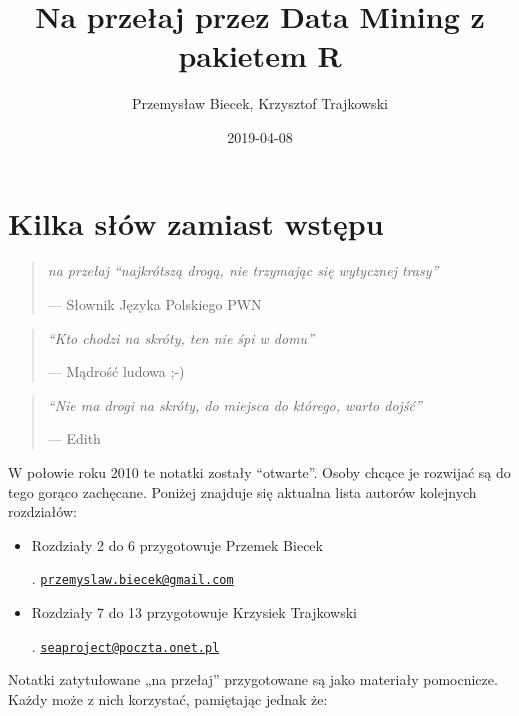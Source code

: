 \documentclass[polish,]{book}
\title{Na przełaj przez Data Mining z pakietem R}
\author{Przemysław Biecek, Krzysztof Trajkowski}
\date{2019-04-08}
\begin{document}
\maketitle

{
\hypersetup{linkcolor=black}
\setcounter{tocdepth}{2}
\tableofcontents
}
\hypertarget{part_1}{%
\chapter{Kilka słów zamiast wstępu}\label{part_1}}

\begin{quote}
\emph{na przełaj ``najkrótszą drogą, nie trzymając się wytycznej trasy''}

--- Słownik Języka Polskiego PWN
\end{quote}

\begin{quote}
\emph{``Kto chodzi na skróty, ten nie śpi w domu''}

--- Mądrość ludowa ;-)
\end{quote}

\begin{quote}
\emph{``Nie ma drogi na skróty, do miejsca do którego, warto dojść''}

--- Edith
\end{quote}

W połowie roku 2010 te notatki zostały ``otwarte''. Osoby chcące je rozwijać
są do tego gorąco zachęcane. Poniżej znajduje się aktualna lista autorów kolejnych
rozdziałów:

\begin{itemize}
\item
  Rozdziały 2 do 6 przygotowuje Przemek Biecek

  . \href{mailto:przemyslaw.biecek@gmail.com}{\nolinkurl{przemyslaw.biecek@gmail.com}}
\item
  Rozdziały 7 do 13 przygotowuje Krzysiek Trajkowski

  . \href{mailto:seaproject@poczta.onet.pl}{\nolinkurl{seaproject@poczta.onet.pl}}
\end{itemize}

Notatki zatytułowane „na przełaj'' przygotowane są jako materiały pomocnicze.
Każdy może z nich korzystać, pamiętając jednak że:
\end{document}

